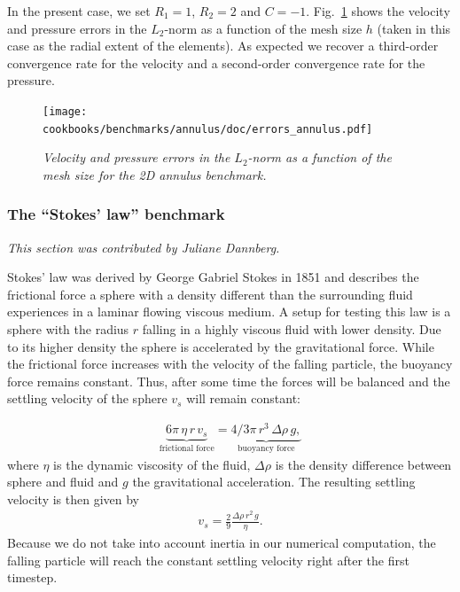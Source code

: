 \documentclass{article}
\begin{document}
In the present case, we set $R_1=1$, $R_2=2$ and $C=-1$. Fig.~\ref{fig:annulus-errors} shows the
velocity and pressure errors in the $L_2$-norm as a function of the mesh size $h$ (taken in this case
as the radial extent of the elements). As expected we recover a third-order convergence rate for the velocity
and a second-order convergence rate for the pressure.

\begin{figure}
\centering
\texttt{[image: cookbooks/benchmarks/annulus/doc/errors\_annulus.pdf]}
\caption{\it Velocity and pressure errors in the $L_2$-norm as a function of the mesh size for the 2D annulus benchmark.}
\label{fig:annulus-errors}
\end{figure}

\subsubsection{The ``Stokes' law'' benchmark}
\label{sec:benchmark-stokes_law}

\textit{This section was contributed by Juliane Dannberg.}

Stokes' law was derived by George Gabriel Stokes in 1851 and describes the frictional force
a sphere with a density different than the surrounding fluid experiences in a
laminar flowing viscous medium.
A setup for testing this law is a sphere with the radius $r$ falling in a highly
viscous fluid with lower density. Due to its higher density the sphere is
accelerated by the gravitational force. While
the frictional force increases with the velocity of the falling particle,
the buoyancy force remains constant. Thus, after some time the forces will
be balanced and the settling velocity of the sphere $v_s$ will remain constant:

\begin{align}
  \label{eq:stokes-law}
  \underbrace{6 \pi \, \eta \, r \, v_s}_{\text{frictional force}} =
  \underbrace{4/3 \pi \, r^3 \, \Delta\rho \, g,}_{\text{buoyancy force}}
\end{align}
where $\eta$ is the dynamic viscosity of the fluid, $\Delta\rho$ is the
density difference between sphere and fluid and $g$ the gravitational
acceleration. The resulting settling velocity is then given by
\begin{align}
  \label{eq:stokes-velo}
  v_s = \frac{2}{9} \frac{\Delta\rho \, r^2 \, g}{\eta}.
\end{align}
Because we do not take into account inertia in our numerical computation,
the falling particle will reach the constant settling velocity right after
the first timestep.
\end{document}
